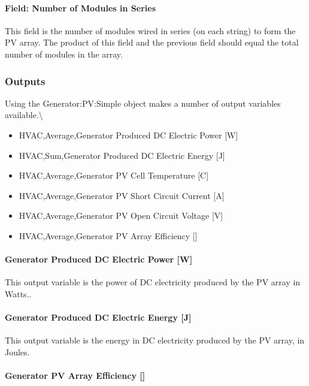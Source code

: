 \paragraph{Field: Number of Modules in Series}\label{field-number-of-modules-in-series}

This field is the number of modules wired in series (on each string) to form the PV array. The product of this field and the previous field should equal the total number of modules in the array.

\subsubsection{Outputs}\label{outputs-11-001}

Using the Generator:PV:Simple object makes a number of output variables available.\textbackslash{}

\begin{itemize}
\item
  HVAC,Average,Generator Produced DC Electric Power {[}W{]}
\item
  HVAC,Sum,Generator Produced DC Electric Energy {[}J{]}
\item
  HVAC,Average,Generator PV Cell Temperature {[}C{]}
\item
  HVAC,Average,Generator PV Short Circuit Current {[}A{]}
\item
  HVAC,Average,Generator PV Open Circuit Voltage {[}V{]}
\item
  HVAC,Average,Generator PV Array Efficiency {[]}
\end{itemize}

\paragraph{Generator Produced DC Electric Power {[}W{]}}\label{generator-produced-dc-electric-power-w-2}

This output variable is the power of DC electricity produced by the PV array in Watts..

\paragraph{Generator Produced DC Electric Energy {[}J{]}}\label{generator-produced-dc-electric-energy-j}

This output variable is the energy in DC electricity produced by the PV array, in Joules.

\paragraph{Generator PV Array Efficiency {[]}}\label{generator-pv-array-efficiency}

